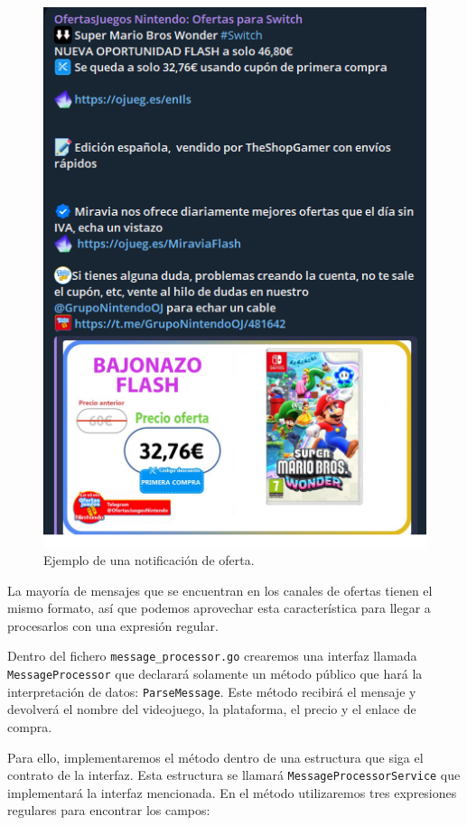 \begin{figure}[h]
    \centering
    \includegraphics[scale=0.5]{figuras/ejemplo-ofertasjuegos.png}
    \caption{Ejemplo de una notificación de oferta.}
    \label{fig:ejemplo de oferta}
\end{figure}

La mayoría de mensajes que se encuentran en los canales de ofertas tienen el mismo 
formato, así que podemos aprovechar esta característica para llegar a procesarlos 
con una expresión regular.

Dentro del fichero \verb|message_processor.go| crearemos una interfaz llamada 
\verb|MessageProcessor| que declarará solamente un método público que hará la 
interpretación de datos: \verb|ParseMessage|. Este método recibirá el mensaje y 
devolverá el nombre del videojuego, la plataforma, el precio y el enlace de compra.

Para ello, implementaremos el método dentro de una estructura que siga el contrato 
de la interfaz. Esta estructura se llamará \verb|MessageProcessorService| que 
implementará la interfaz mencionada. En el método utilizaremos tres expresiones 
regulares para encontrar los campos:

